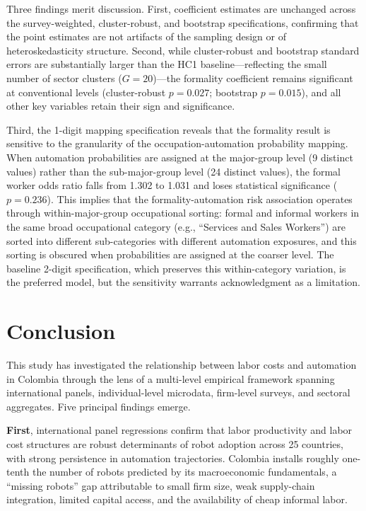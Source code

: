 \documentclass{article}
\begin{document}
Three findings merit discussion. First, coefficient estimates are unchanged across the survey-weighted, cluster-robust, and bootstrap specifications, confirming that the point estimates are not artifacts of the sampling design or of heteroskedasticity structure. Second, while cluster-robust and bootstrap standard errors are substantially larger than the HC1 baseline---reflecting the small number of sector clusters ($G = 20$)---the formality coefficient remains significant at conventional levels (cluster-robust $p = 0.027$; bootstrap $p = 0.015$), and all other key variables retain their sign and significance.

Third, the 1-digit mapping specification reveals that the formality result is sensitive to the granularity of the occupation-automation probability mapping. When automation probabilities are assigned at the major-group level (9 distinct values) rather than the sub-major-group level (24 distinct values), the formal worker odds ratio falls from 1.302 to 1.031 and loses statistical significance ($p = 0.236$). This implies that the formality-automation risk association operates through within-major-group occupational sorting: formal and informal workers in the same broad occupational category (e.g., ``Services and Sales Workers'') are sorted into different sub-categories with different automation exposures, and this sorting is obscured when probabilities are assigned at the coarser level. The baseline 2-digit specification, which preserves this within-category variation, is the preferred model, but the sensitivity warrants acknowledgment as a limitation.

\FloatBarrier
\section{Conclusion}
\label{sec:conclusion}

This study has investigated the relationship between labor costs and automation in Colombia through the lens of a multi-level empirical framework spanning international panels, individual-level microdata, firm-level surveys, and sectoral aggregates. Five principal findings emerge.

\textbf{First}, international panel regressions confirm that labor productivity and labor cost structures are robust determinants of robot adoption across 25 countries, with strong persistence in automation trajectories. Colombia installs roughly one-tenth the number of robots predicted by its macroeconomic fundamentals, a ``missing robots'' gap attributable to small firm size, weak supply-chain integration, limited capital access, and the availability of cheap informal labor.
\end{document}
